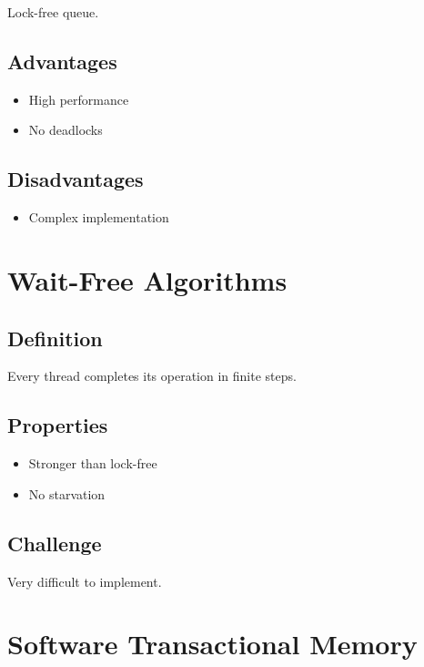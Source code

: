 Lock-free queue.

\subsection{Advantages}

\begin{itemize}
\item High performance
\item No deadlocks
\end{itemize}

\subsection{Disadvantages}

\begin{itemize}
\item Complex implementation
\end{itemize}

\section{Wait-Free Algorithms}

\subsection{Definition}

Every thread completes its operation in finite steps.

\subsection{Properties}

\begin{itemize}
\item Stronger than lock-free
\item No starvation
\end{itemize}

\subsection{Challenge}

Very difficult to implement.

\section{Software Transactional Memory}

